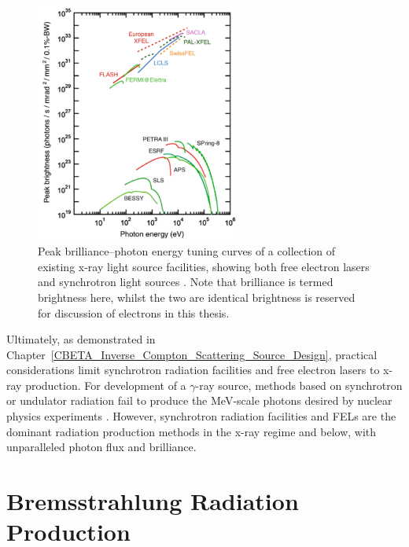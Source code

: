 \documentclass[../main.tex]{subfiles}
\begin{document}
\begin{figure}[!h]
\centering
\includegraphics[width=0.6\textwidth]{Figures/Introduction/Light_Source_Brilliance_Energy.pdf}
\caption{Peak brilliance--photon energy tuning curves of a collection of existing x-ray light source facilities, showing both free electron lasers and synchrotron light sources \cite{geloni2017physics}. Note that brilliance is termed brightness here, whilst the two are identical brightness is reserved for discussion of electrons in this thesis.}
\label{fig:light_source_tuning_curves}
\end{figure}

Ultimately, as demonstrated in Chapter~\ref{CBETA_Inverse_Compton_Scattering_Source_Design}, practical considerations limit synchrotron radiation facilities and free electron lasers to x-ray production. For development of a $\gamma$-ray source, methods based on synchrotron or undulator radiation fail to produce the \si{\mega\electronvolt}-scale photons desired by nuclear physics experiments \cite{budker2021expanding}. However, synchrotron radiation facilities and FELs are the dominant radiation production methods in the x-ray regime and below, with unparalleled photon flux and brilliance.  

\section{Bremsstrahlung Radiation Production}
\label{sec:bremsstrahlung}
\end{document}

